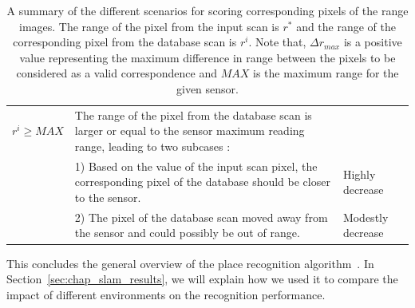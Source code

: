 \begin{table}[H]
\begin{tabular}{@{}p{}p{}p{}@{}}
        $r^i \ge MAX$                    & The range of the pixel from the database scan is larger or equal to the sensor maximum reading range, leading to two subcases : & \\
                                         & 1) Based on the value of the input scan pixel, the corresponding pixel of the database should be closer to the sensor.  & Highly decrease \\
                                         & 2) The pixel of the database scan moved away from the sensor and could possibly be out of range.                        & Modestly decrease \\
        \bottomrule
    \end{tabular}
    \caption{A summary of the different scenarios for scoring corresponding pixels of the range images. The range of the pixel from the input scan is $r^*$ and the range of the corresponding pixel from the database scan is $r^i$. Note that, $\Delta r_{max}$ is a positive value representing the maximum difference in range between the pixels to be considered as a valid correspondence and $MAX$ is the maximum range for the given sensor.}
    \label{tab:chap_slam_scoring_scenarios}
\end{table}

This concludes the general overview of the place recognition algorithm~\citep{Steder2011b}. In Section~\ref{sec:chap_slam_results}, we will explain how we used it to compare the impact of different environments on the recognition performance.
